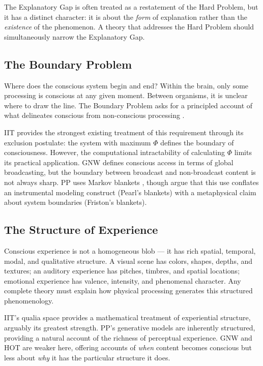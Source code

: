 \documentclass[12pt]{article}
\begin{document}
The Explanatory Gap is often treated as a restatement of the Hard Problem, but it has a distinct character: it is about the \emph{form} of explanation rather than the \emph{existence} of the phenomenon. A theory that addresses the Hard Problem should simultaneously narrow the Explanatory Gap.


\subsection{The Boundary Problem}


Where does the conscious system begin and end? Within the brain, only some processing is conscious at any given moment. Between organisms, it is unclear where to draw the line. The Boundary Problem asks for a principled account of what delineates conscious from non-conscious processing \citep[see][]{Bayne2010,Tononi2004}.

IIT provides the strongest existing treatment of this requirement through its exclusion postulate: the system with maximum $\Phi$ defines the boundary of consciousness. However, the computational intractability of calculating $\Phi$ limits its practical application. GNW defines conscious access in terms of global broadcasting, but the boundary between broadcast and non-broadcast content is not always sharp. PP uses Markov blankets \citep{Friston2010}, though \citet{Bruineberg2022} argue that this use conflates an instrumental modeling construct (Pearl's blankets) with a metaphysical claim about system boundaries (Friston's blankets).


\subsection{The Structure of Experience}


Conscious experience is not a homogeneous blob --- it has rich spatial, temporal, modal, and qualitative structure. A visual scene has colors, shapes, depths, and textures; an auditory experience has pitches, timbres, and spatial locations; emotional experience has valence, intensity, and phenomenal character. Any complete theory must explain how physical processing generates this structured phenomenology.

IIT's qualia space provides a mathematical treatment of experiential structure, arguably its greatest strength. PP's generative models are inherently structured, providing a natural account of the richness of perceptual experience. GNW and HOT are weaker here, offering accounts of \emph{when} content becomes conscious but less about \emph{why} it has the particular structure it does.
\end{document}
